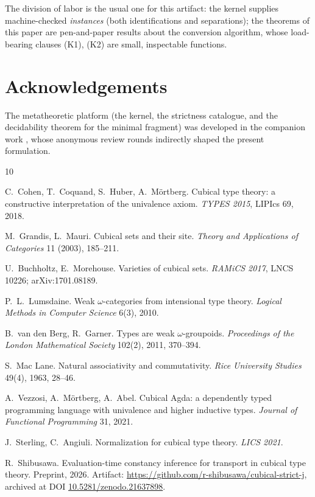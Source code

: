 \documentclass[11pt]{amsart}
\theoremstyle{definition}
\begin{document}
The division of labor is the usual one for this artifact: the
kernel supplies machine-checked \emph{instances} (both
identifications and separations); the theorems of this paper are
pen-and-paper results about the conversion algorithm, whose
load-bearing clauses (K1), (K2) are small, inspectable functions.

\section*{Acknowledgements}

The metatheoretic platform (the kernel, the strictness catalogue,
and the decidability theorem for the minimal fragment) was
developed in the companion work \cite{Companion}, whose anonymous
review rounds indirectly shaped the present formulation.

\begin{thebibliography}{10}

C.~Cohen, T.~Coquand, S.~Huber, A.~M\"ortberg.
\newblock Cubical type theory: a constructive interpretation of the
  univalence axiom.
\newblock \emph{TYPES 2015}, LIPIcs 69, 2018.

M.~Grandis, L.~Mauri.
\newblock Cubical sets and their site.
\newblock \emph{Theory and Applications of Categories} 11 (2003),
  185--211.

U.~Buchholtz, E.~Morehouse.
\newblock Varieties of cubical sets.
\newblock \emph{RAMiCS 2017}, LNCS 10226; arXiv:1701.08189.

P.~L.~Lumsdaine.
\newblock Weak $\omega$-categories from intensional type theory.
\newblock \emph{Logical Methods in Computer Science} 6(3), 2010.

B.~van den Berg, R.~Garner.
\newblock Types are weak $\omega$-groupoids.
\newblock \emph{Proceedings of the London Mathematical Society}
  102(2), 2011, 370--394.

S.~Mac Lane.
\newblock Natural associativity and commutativity.
\newblock \emph{Rice University Studies} 49(4), 1963, 28--46.

A.~Vezzosi, A.~M\"ortberg, A.~Abel.
\newblock Cubical Agda: a dependently typed programming language
  with univalence and higher inductive types.
\newblock \emph{Journal of Functional Programming} 31, 2021.

J.~Sterling, C.~Angiuli.
\newblock Normalization for cubical type theory.
\newblock \emph{LICS 2021}.

R.~Shibusawa.
\newblock Evaluation-time constancy inference for transport in
  cubical type theory.
\newblock Preprint, 2026.  Artifact:
  \url{https://github.com/r-shibusawa/cubical-strict-j}, archived at
  DOI \href{https://doi.org/10.5281/zenodo.21637898}%
  {10.5281/zenodo.21637898}.

\end{thebibliography}
\end{document}
